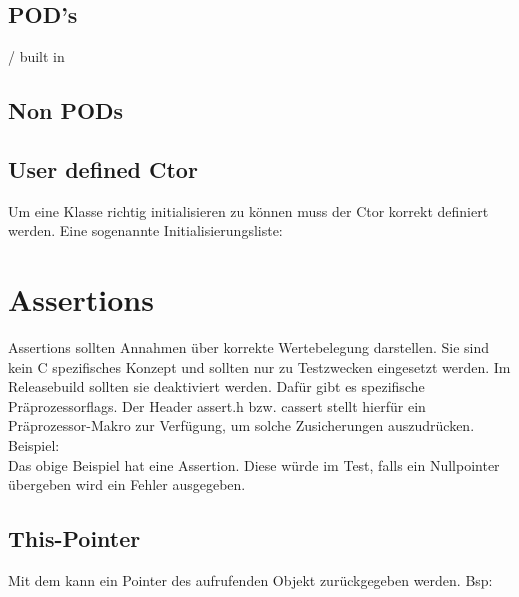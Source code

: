 \subsection{POD's}

 / built in 



\subsection{Non PODs}



\subsection{User defined Ctor}

Um eine Klasse richtig initialisieren zu können muss der Ctor korrekt definiert werden. 
Eine sogenannte Initialisierungsliste:



\section{Assertions}

Assertions sollten Annahmen über korrekte Wertebelegung darstellen. 
Sie sind kein C spezifisches Konzept und sollten nur zu Testzwecken eingesetzt werden. 
Im Releasebuild sollten sie deaktiviert werden. 
Dafür gibt es spezifische Präprozessorflags.
Der Header assert.h bzw. cassert stellt hierfür ein Präprozessor-Makro  zur Verfügung, um solche Zusicherungen auszudrücken.\\
Beispiel:\\



Das obige Beispiel hat eine Assertion. 
Diese würde im Test, falls ein Nullpointer übergeben wird ein Fehler ausgegeben. 

\subsection{This-Pointer}

Mit dem  kann ein Pointer des aufrufenden Objekt zurückgegeben werden. Bsp:



